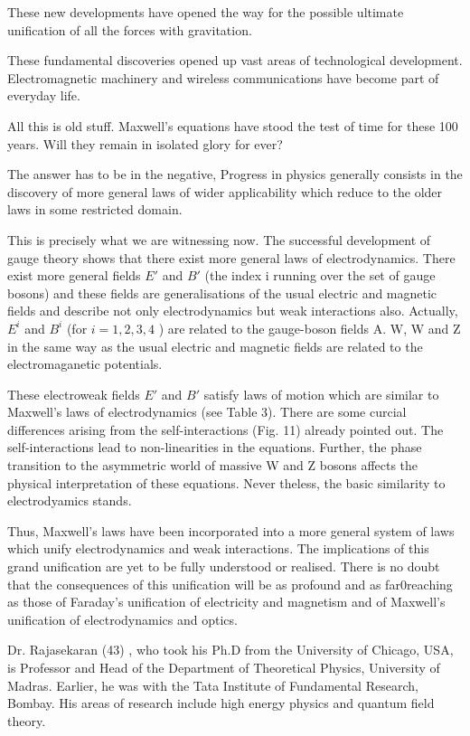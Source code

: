 These new developments have opened the way for the possible ultimate unification of all the forces with gravitation.

These fundamental discoveries opened up vast areas of technological development. Electromagnetic machinery and wireless communications have become part of everyday life.

All this is old stuff. Maxwell's equations have stood the test of time for these 100 years. Will they remain in isolated glory for ever?

The answer has to be in the negative, Progress in physics generally consists in the discovery of more general laws of wider applicability which reduce to the older laws in some restricted domain.

This is precisely what we are witnessing now. The successful development of gauge theory shows that there exist more general laws of electrodynamics. There exist more general fields $E'$ and $B'$ (the index i running over the set of gauge bosons) and these fields are generalisations of the usual electric and magnetic fields and describe not only electrodynamics but weak interactions also. Actually, $E^{i}$ and $B^{i}$ (for $i=1,2,3,4$ ) are related to the gauge-boson fields A. W, W and Z in the same way as the usual electric and magnetic fields are related to the electromaganetic potentials.

These electroweak fields $E'$ and $B'$ satisfy laws of motion which are similar to Maxwell's laws of electrodynamics (see Table 3). There are some curcial differences arising from the self-interactions (Fig. 11) already pointed out. The self-interactions lead to non-linearities in the equations. Further, the phase transition to the asymmetric world of massive W and Z bosons affects the physical interpretation of these equations. Never theless, the basic similarity to electrodyamics stands.

Thus, Maxwell's laws have been incorporated into a more general system of laws which unify electrodynamics and weak interactions. The implications of this grand unification are yet to be fully understood or realised. There is no doubt that the consequences of this unification will be as profound and as far0reaching as those of Faraday's unification of electricity and magnetism and of Maxwell's unification of electrodynamics and optics.

Dr. Rajasekaran (43) , who  took his Ph.D from the University of Chicago, USA, is Professor and Head of the Department of Theoretical Physics, University of Madras. Earlier, he was with the Tata Institute of Fundamental Research, Bombay. His areas of research include high energy physics and quantum field theory.























 



